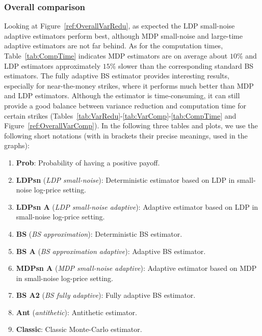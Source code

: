 \subsubsection{Overall comparison}

Looking at Figure~\ref{ref:OverallVarRedu}, as expected the LDP small-noise adaptive estimators perform best, although MDP small-noise and large-time adaptive estimators are not far behind. 
As for the computation times, Table~\ref{tab:CompTime} indicates MDP estimators are on average about $10\%$  and LDP estimators approximately $15\%$ slower than the corresponding standard BS estimators. The fully adaptive BS estimator provides interesting results, especially for near-the-money strikes, where it performs much better than MDP and LDP estimators. 
Although the estimator is time-consuming, it can still provide a good balance between variance reduction and computation time for certain strikes (Tables~\ref{tab:VarRedu}-\ref{tab:VarComp}-\ref{tab:CompTime} and Figure~\ref{ref:OverallVarComp}).
In the following three tables and plots, we use the following short notations (with in brackets their precise meanings, used in the graphs):
\begin{enumerate}[-]
    \item \textbf{Prob}: Probability of having a positive payoff.
    \item \textbf{LDPsn} (\textit{LDP small-noise}): Deterministic estimator based on LDP in small-noise log-price setting.
    \item \textbf{LDPsn A} (\textit{LDP small-noise adaptive}): Adaptive estimator based on LDP in small-noise log-price setting.
    \item \textbf{BS} (\textit{BS approximation}): Deterministic BS estimator.
    \item \textbf{BS A} (\textit{BS approximation adaptive}): Adaptive BS estimator.
    \item \textbf{MDPsn A} (\textit{MDP small-noise adaptive}): Adaptive estimator based on MDP in small-noise log-price setting.
    \item \textbf{BS A2} (\textit{BS fully adaptive}): Fully adaptive BS estimator.
    \item \textbf{Ant} (\textit{antithetic}): Antithetic estimator.
    \item \textbf{Classic}: Classic Monte-Carlo estimator.
\end{enumerate}
